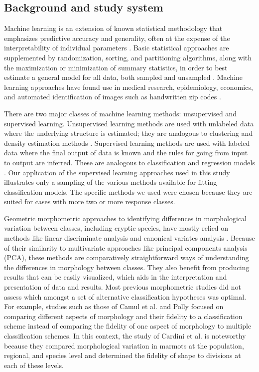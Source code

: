 \documentclass[10pt,letterpaper]{article}
\begin{document}
\subsection*{Background and study system}
Machine learning is an extension of known statistical methodology that emphasizes predictive accuracy and generality, often at the expense of the interpretability of individual parameters \cite{Hastie2009}. Basic statistical approaches are supplemented by randomization, sorting, and partitioning algorithms, along with the maximization or minimization of summary statistics, in order to best estimate a general model for all data, both sampled and unsampled \cite{Hastie2009}. Machine learning approaches have found use in medical research, epidemiology, economics, and automated identification of images such as handwritten zip codes \cite{Hastie2009}. %

There are two major classes of machine learning methods: unsupervised and supervised learning. Unsupervised learning methods are used with unlabeled data where the underlying structure is estimated; they are analogous to clustering and density estimation methods \cite{Kaufman1990}. Supervised learning methods are used with labeled data where the final output of data is known and the rules for going from input to output are inferred. These are analogous to classification and regression models \cite{Breiman1984,Hastie2009}. Our application of the supervised learning approaches used in this study illustrates only a sampling of the various methods available for fitting classification models. The specific methods we used were chosen because they are suited for cases with more two or more response classes.

Geometric morphometric approaches to identifying differences in morphological variation between classes, including cryptic species, have mostly relied on methods like linear discriminate analysis and canonical variates analysis \cite{Polly2003,Zelditch2004,Gaubert2005b,Gunduz2007,Polly2007a,Francoy2009,Sztencel-Jabonka2009,Edwards2011,MitrovskiBogdanovic2013,Dillard2017}. Because of their similarity to multivariate approaches like principal components analysis (PCA), these methods are comparatively straightforward ways of understanding the differences in morphology between classes. They also benefit from producing results that can be easily visualized, which aids in the interpretation and presentation of data and results. Most previous morphometric studies did not assess which amongst a set of alternative classification hypotheses was optimal. For example, studies such as those of Camul et al. \cite{Caumul2005a} and Polly \cite{Polly2007a} focused on comparing different aspects of morphology and their fidelity to a classification scheme instead of comparing the fidelity of one aspect of morphology to multiple classification schemes. In this context, the study of Cardini et al. \cite{Cardini2009a} is noteworthy because they compared morphological variation in marmots at the population, regional, and species level and determined the fidelity of shape to divisions at each of these levels.
\end{document}
